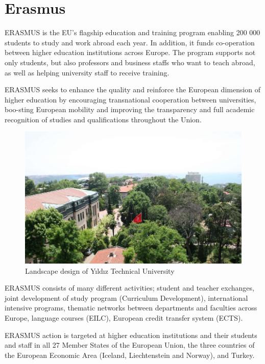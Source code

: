 \chapter{Erasmus}
ERASMUS is the EU's flagship education and training program enabling 200 000 students to study and work abroad each year. In addition, it funds co-operation between higher education institutions across Europe. The program supports not only students, but also professors and business staffs who want to teach abroad, as well as helping university staff to receive training.

ERASMUS seeks to enhance the quality and reinforce the European dimension of higher education by encouraging transnational cooperation between universities, boo-sting European mobility and improving the transparency and full academic recognition of studies and qualifications throughout the Union.

\begin{figure}[!htbp]
\centering
\includegraphics[width=\textwidth]{projectChapters/images/Picture1.png}
\caption{Landscape design of Yıldız Technical University}
\label{fig:ornek3}
\end{figure}

ERASMUS consists of many different activities; student and teacher exchanges, joint development of study program (Curriculum Development), international intensive programs, thematic networks between departments and faculties across Europe, language courses (EILC), European credit transfer system (ECTS).

ERASMUS action is targeted at higher education institutions and their students and staff in all 27 Member States of the European Union, the three countries of the European Economic Area (Iceland, Liechtenstein and Norway), and Turkey.

